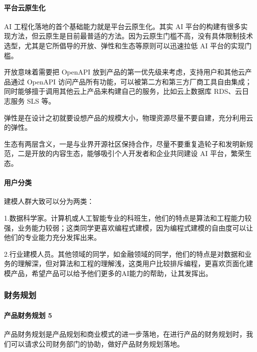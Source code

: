 \documentclass[letterpaper,10pt,english]{sphinxmanual}
\begin{document}
\paragraph{平台云原生化}
\label{\detokenize{chapter_introduction/platform:id10}}
AI 工程化落地的首个基础能力就是平台云原生化。其实 AI
平台的构建有很多实现方法，但云原生是目前最普适的方法。因为云原生门槛不高，没有具体限制技术选型，尤其是它所倡导的开放、弹性和生态等原则可以迅速拉低
AI 平台的实现门槛。

开放意味着需要把 OpenAPI
放到产品的第一优先级来考虑，支持用户和其他云产品通过 OpenAPI
访问产品所有功能，可以被第二方和第三方厂商工具自由集成；同时能够擅于调用其他云上产品来构建自己的服务，比如云上数据库
RDS、云日志服务 SLS 等。

弹性是在设计之初就要设想产品的规模大小，物理资源尽量不要自建，充分利用云的弹性。

生态有两层含义，一是与业界开源社区保持合作，尽量不要重复造轮子和发明新规范，二是开放的内容生态，能够吸引个人开发者和企业共同建设
AI 平台，繁荣生态。


\paragraph{用户分类}
\label{\detokenize{chapter_introduction/platform:id11}}
建模人群大致可以分为两类：

1.数据科学家。计算机或人工智能专业的科班生，他们的特点是算法和工程能力较强，业务能力较弱；这类同学更喜欢编程式建模，因为编程式建模的自由度可以让他们的专业能力充分发挥出来。

2.行业建模人员。其他领域的同学，如金融领域的同学，他们的特点是对数据和业务的理解深，但对算法和工程的理解浅，这类用户比较排斥编程，更喜欢页面化建模产品，希望产品可以给予他们更多的AI能力的帮助，让其发挥出。%
\begin{footnote}[137]\sphinxAtStartFootnote
{}
%
\end{footnote}


\subsubsection{财务规划}
\label{\detokenize{chapter_introduction/money:id1}}\label{\detokenize{chapter_introduction/money::doc}}

\paragraph{产品财务规划 5\sphinxfootnotemark[138]}
\label{\detokenize{chapter_introduction/money:id2}}%
\begin{footnotetext}[138]\sphinxAtStartFootnote
{}
%
\end{footnotetext}\ignorespaces 
产品财务规划是产品规划和商业模式的进一步落地，在进行产品的财务规划时，我们可以请求公司财务部门的协助，做好产品财务规划落地。
\end{document}
